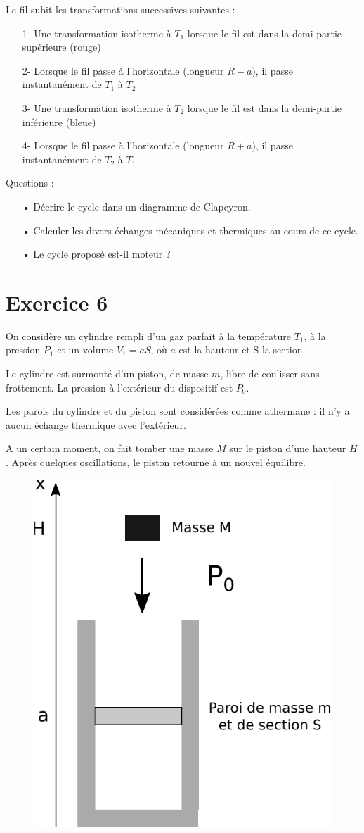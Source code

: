 \documentclass{report}
\begin{document}
Le fil subit les transformations successives suivantes :
\begin{itemize}
\item[1-] Une transformation isotherme à $T_1$ lorsque le fil est dans la demi-partie supérieure (rouge)
\item[2-] Lorsque le fil passe à l'horizontale (longueur $R-a$), il passe instantanément de $T_1$ à $T_2$
\item[3-] Une transformation isotherme à $T_2$ lorsque le fil est dans la demi-partie inférieure (bleue)
\item[4-] Lorsque le fil passe à l'horizontale (longueur $R+a$), il passe instantanément de $T_2$ à $T_1$
\end{itemize}
Questions : 
\begin{itemize}
\item[•] Décrire le cycle dans un diagramme de Clapeyron.
\item[•] Calculer les divers échanges mécaniques et thermiques au cours de ce cycle.
\item[•] Le cycle proposé est-il moteur ?
\end{itemize}

\newpage

\section*{Exercice 6}

On considère un cylindre rempli d'un gaz parfait à la température $T_1$, à la pression $P_1$ et un volume $V_1=aS$, où $a$ est la hauteur et S la section.

Le cylindre est surmonté d'un piston, de masse $m$, libre de coulisser sans frottement. La pression à l'extérieur du dispositif est $P_0$.

Les parois du cylindre et du piston sont considérées comme athermane : il n'y a aucun échange thermique avec l'extérieur.

A un certain moment, on fait tomber une masse $M$ sur le piston d'une hauteur $H$. Après quelques oscillations, le piston retourne à un nouvel équilibre.


\begin{figure}[!h]
\centering
\includegraphics[width=0.5\linewidth]{thermo4.pdf}
\end{figure}
\end{document}
